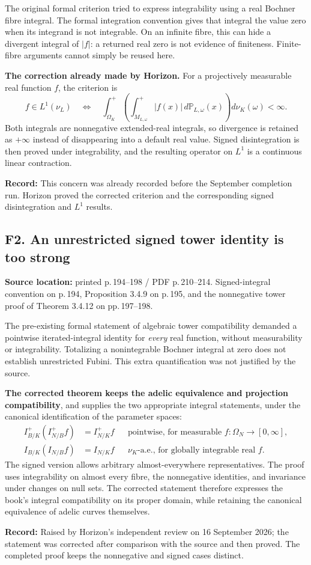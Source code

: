 \documentclass[10pt,a4paper]{article}
\newcommand{\loc}[2]{\textbf{Source location:} printed p.\,#1 / PDF p.\,#2.}
\newcommand{\hist}[1]{\par{\footnotesize\color{graytext}\textbf{Record:} #1}}
\newcommand{\PP}{\mathbb P}
\begin{document}
The original formal criterion tried to express integrability using a
real Bochner fibre integral. The formal integration convention gives that integral the value zero
when its integrand is not integrable. On an infinite fibre, this can
hide a divergent integral of $|f|$: a returned real zero is not evidence
of finiteness. Finite-fibre arguments cannot simply be reused here.

\textbf{The correction already made by Horizon.} For a projectively
measurable real function $f$, the criterion is
\[
 f\in L^1(\nu_L)
 \quad\Longleftrightarrow\quad
 \int_{\Omega_K}^{+}\!\left(\int_{M_{L,\omega}}^{+}|f(x)|\,
 d\PP_{L,\omega}(x)\right)d\nu_K(\omega)<\infty.
\]
Both integrals are nonnegative extended-real integrals, so divergence
is retained as $+\infty$ instead of disappearing into a default real value. Signed
disintegration is then proved under integrability, and the resulting
operator on $L^1$ is a continuous linear contraction.
\hist{This concern was already recorded before the September completion
run. Horizon proved the corrected criterion and the corresponding
signed disintegration and $L^1$ results.}

\subsection{F2. An unrestricted signed tower identity is too strong}
\loc{194--198}{210--214} Signed-integral convention on p.\,194,
Proposition 3.4.9 on p.\,195, and the nonnegative tower proof of
Theorem 3.4.12 on pp.\,197--198.

The pre-existing formal statement of algebraic tower compatibility demanded a
pointwise iterated-integral identity for \emph{every} real function,
without measurability or integrability. Totalizing a nonintegrable
Bochner integral at zero does not establish unrestricted Fubini.
This extra quantification was not justified by the source.

\textbf{The corrected theorem keeps the adelic equivalence and projection
compatibility}, and supplies the two appropriate integral statements,
under the canonical identification of the parameter spaces:
\begin{align*}
 I^+_{B/K}(I^+_{N/B}f)&=I^+_{N/K}f
 &&\text{pointwise, for measurable }f:\Omega_N\to[0,\infty],\\
 I_{B/K}(I_{N/B}f)&=I_{N/K}f
 &&\nu_K\text{-a.e., for globally integrable real }f.
\end{align*}
The signed version allows arbitrary almost-everywhere representatives.
The proof uses integrability on almost every fibre, the nonnegative
identities, and invariance under changes on null sets.
The corrected statement therefore expresses the book's integral
compatibility on its proper domain, while retaining the canonical
equivalence of adelic curves themselves.
\hist{Raised by Horizon's independent review on 16 September 2026;
the statement was corrected after comparison with the source and then
proved. The completed proof keeps the nonnegative and signed cases distinct.}
\end{document}
